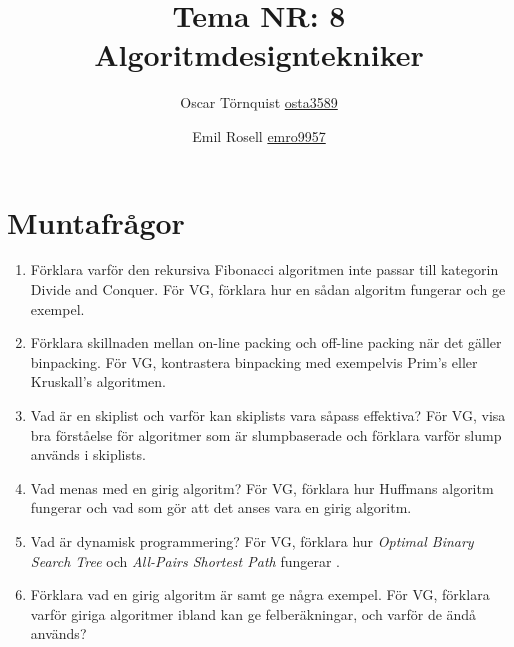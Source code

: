 \documentclass[a5paper,10pt,oneside]{article}
\title{Tema NR: 8 Algoritmdesigntekniker}
\author{Oscar Törnquist \url{osta3589} \and Emil Rosell \url{emro9957}}
\begin{document}
\maketitle

\section*{Muntafrågor}
\begin{enumerate}
\item Förklara varför den rekursiva Fibonacci algoritmen inte passar till kategorin Divide and Conquer. För VG, förklara hur en sådan algoritm fungerar och ge exempel.

\item Förklara skillnaden mellan on-line packing och off-line packing när det gäller binpacking. För VG, kontrastera binpacking med exempelvis Prim's eller Kruskall's algoritmen.

\item Vad är en skiplist och varför kan skiplists vara såpass effektiva? För VG, visa bra förståelse för algoritmer som är slumpbaserade och förklara varför slump används i skiplists.
\item
Vad menas med en girig algoritm? För VG, förklara hur Huffmans algoritm fungerar och vad som gör att det anses vara en girig algoritm.
\item
Vad är dynamisk programmering? För VG, förklara hur \textit{Optimal Binary Search Tree} och \textit{All-Pairs Shortest Path} fungerar . 
\item
Förklara vad en girig algoritm är samt ge några exempel. För VG, förklara varför giriga algoritmer ibland kan ge felberäkningar, och varför de ändå används?

\end{enumerate}
\end{document}

